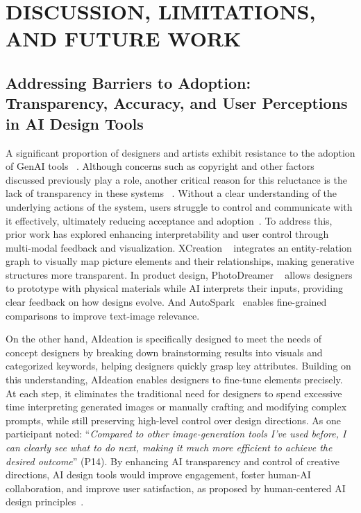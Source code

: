 \section{DISCUSSION, LIMITATIONS, AND FUTURE WORK}


\subsection{Addressing Barriers to Adoption: Transparency, Accuracy, and User Perceptions in AI Design Tools}
A significant proportion of designers and artists exhibit resistance to the adoption of GenAI tools ~\cite{kawakami2024impact, jiang2023ai}. Although concerns such as copyright and other factors discussed previously play a role, another critical reason for this reluctance is the lack of transparency in these systems ~\cite{zhang2024confrontation, shi2023understanding}. Without a clear understanding of the underlying actions of the system, users struggle to control and communicate with it effectively, ultimately reducing acceptance and adoption~\cite{auernhammer2020human, Usmani2023Human-Centered}. 
To address this, prior work has explored enhancing interpretability and user control through multi-modal feedback and visualization. XCreation ~\cite{yan2023xcreation} integrates an entity-relation graph to visually map picture elements and their relationships, making generative structures more transparent. In product design, PhotoDreamer ~\cite{zhang2024protodreamer} allows designers to prototype with physical materials while AI interprets their inputs, providing clear feedback on how designs evolve. And AutoSpark~\cite{chen2024autospark} enables fine-grained comparisons to improve text-image relevance. 

On the other hand, AIdeation is specifically designed to meet the needs of concept designers by breaking down brainstorming results into visuals and categorized keywords, helping designers quickly grasp key attributes. Building on this understanding, AIdeation enables designers to fine-tune elements precisely. At each step, it eliminates the traditional need for designers to spend excessive time interpreting generated images or manually crafting and modifying complex prompts, while still preserving high-level control over design directions. As one participant noted: “\textit{Compared to other image-generation tools I've used before, I can clearly see what to do next, making it much more efficient to achieve the desired outcome}” (P14). By enhancing AI transparency and control of creative directions, AI design tools would improve engagement, foster human-AI collaboration, and improve user satisfaction, as proposed by human-centered AI design principles~\cite{shneiderman2022human}.

